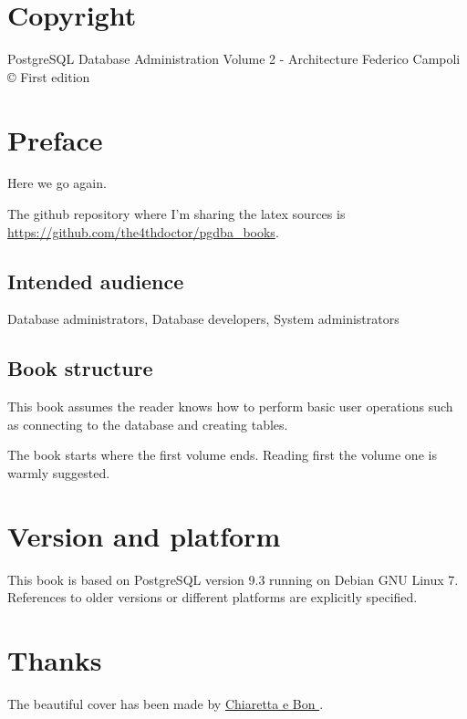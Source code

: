 \documentclass[twoside]{book}
\begin{document}
\chapter*{Copyright}
PostgreSQL Database Administration Volume 2 - Architecture\newline
Federico Campoli \copyright {} \newline
First edition\newline



 



\chapter*{Preface}
Here we go again.


The github repository where I'm sharing the latex sources  is 
\href{https://github.com/the4thdoctor/pgdba\_books}{
https://github.com/the4thdoctor/pgdba\_books}.\newline


\section*{Intended audience}
Database administrators,  Database developers, System administrators

\section*{Book structure}
This book assumes the reader knows how to perform basic user operations such as
connecting to the database and creating tables.\newline

The book starts where the first volume ends. Reading first the volume one is warmly suggested.\newline


\chapter*{Version and platform}
This book is based on PostgreSQL version 9.3 running on Debian GNU Linux 7.
References to older versions or different platforms are explicitly specified.

\chapter*{Thanks}
The beautiful cover has been made by \href{http://www.bonland.eu/}{Chiaretta e Bon }.\newline
\end{document}
